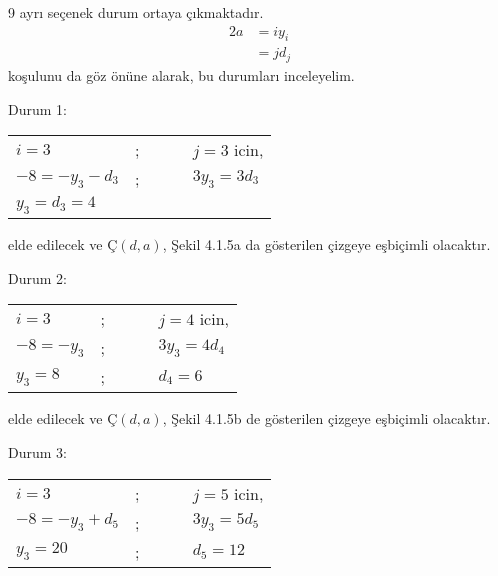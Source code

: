 \documentclass[11pt]{amsbook}
\begin{document}
    9 ayrı seçenek durum ortaya çıkmaktadır. 
    \begin{align*}
        2a  &= iy_i \\
            &= jd_j
    \end{align*}
    koşulunu da göz önüne alarak, bu durumları inceleyelim.
    
    Durum 1:
    \begin{center}
        \begin{tabular}{lll}
            $i = 3$              &; $\qquad$ &$j = 3$ icin,     \\
            $- 8 = - y_3 - d_3$   &; $\qquad$ &$3 y_3 = 3 d_3$   \\
            $y_3 = d_3 = 4$       & & \\
        \end{tabular}
    \end{center}
    elde edilecek ve $Ç(d,a)$, Şekil 4.1.5a da gösterilen çizgeye eşbiçimli olacaktır.
    
    Durum 2:
    \begin{center}
        \begin{tabular}{lll}
            $i = 3$          &;  $\qquad$ &$j = 4$ icin,      \\
            $- 8= - y_3$     &;  $\qquad$ &$3 y_3 = 4 d_4$    \\
            $y_3 = 8$        &;  $\qquad$ &$d_4 = 6$          \\
        \end{tabular}
    \end{center}
    elde edilecek ve $Ç(d,a)$, Şekil 4.1.5b de gösterilen çizgeye eşbiçimli olacaktır.
    
    Durum 3:
    \begin{center}
        \begin{tabular}{lll}
            $i = 3$              &;  $\qquad$ &$j = 5$ icin,     \\
            $- 8= - y_3 + d_5$   &;  $\qquad$ &$3 y_3 = 5 d_5$   \\
            $y_3 = 20$           &;  $\qquad$ &$d_5 = 12$ \\
        \end{tabular}
    \end{center}
\end{document}
